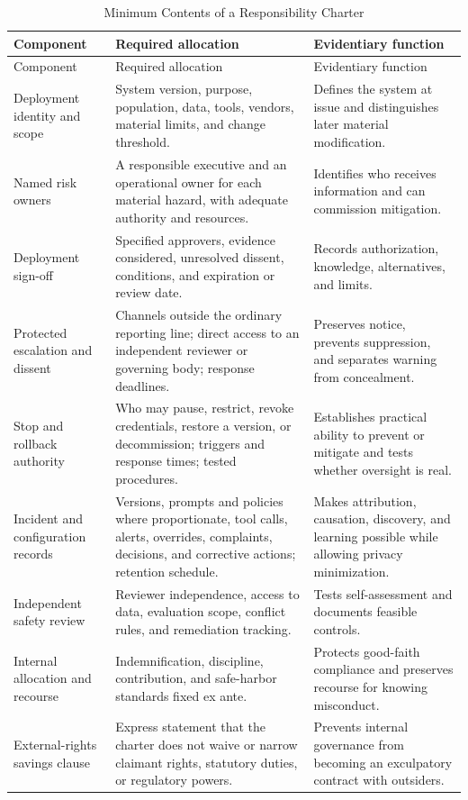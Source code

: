 \begin{longtable}{>{\raggedright\arraybackslash}p{} >{\raggedright\arraybackslash}p{} >{\raggedright\arraybackslash}p{}}
\caption{Minimum Contents of a Responsibility Charter}\label{tab:charter}\\
\toprule
Component & Required allocation & Evidentiary function \\
\midrule
\endfirsthead
\toprule
Component & Required allocation & Evidentiary function \\
\midrule
\endhead
Deployment identity and scope & System version, purpose, population, data, tools, vendors, material limits, and change threshold. & Defines the system at issue and distinguishes later material modification. \\
Named risk owners & A responsible executive and an operational owner for each material hazard, with adequate authority and resources. & Identifies who receives information and can commission mitigation. \\
Deployment sign-off & Specified approvers, evidence considered, unresolved dissent, conditions, and expiration or review date. & Records authorization, knowledge, alternatives, and limits. \\
Protected escalation and dissent & Channels outside the ordinary reporting line; direct access to an independent reviewer or governing body; response deadlines. & Preserves notice, prevents suppression, and separates warning from concealment. \\
Stop and rollback authority & Who may pause, restrict, revoke credentials, restore a version, or decommission; triggers and response times; tested procedures. & Establishes practical ability to prevent or mitigate and tests whether oversight is real. \\
Incident and configuration records & Versions, prompts and policies where proportionate, tool calls, alerts, overrides, complaints, decisions, and corrective actions; retention schedule. & Makes attribution, causation, discovery, and learning possible while allowing privacy minimization. \\
Independent safety review & Reviewer independence, access to data, evaluation scope, conflict rules, and remediation tracking. & Tests self-assessment and documents feasible controls. \\
Internal allocation and recourse & Indemnification, discipline, contribution, and safe-harbor standards fixed ex ante. & Protects good-faith compliance and preserves recourse for knowing misconduct. \\
External-rights savings clause & Express statement that the charter does not waive or narrow claimant rights, statutory duties, or regulatory powers. & Prevents internal governance from becoming an exculpatory contract with outsiders. \\
\bottomrule
\end{longtable}

